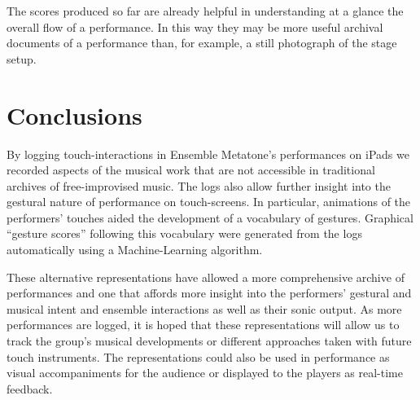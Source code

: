 \documentclass[graybox]{svmult}
\begin{document}
The scores produced so far are already helpful in understanding at a
glance the overall flow of a performance. In this way they may be more
useful archival documents of a performance than, for example, a still
photograph of the stage setup.

\section{Conclusions}

By logging touch-interactions in Ensemble Metatone's performances on
iPads we recorded aspects of the musical work that are not accessible
in traditional archives of free-improvised music. The logs also allow
further insight into the gestural nature of performance on
touch-screens. In particular, animations of the performers' touches
aided the development of a vocabulary of gestures.  Graphical
``gesture scores'' following this vocabulary were generated from
the logs automatically using a Machine-Learning algorithm. 

These alternative representations have allowed a more comprehensive archive
of performances and one that affords more insight into the performers'
gestural and musical intent and ensemble interactions as well as
their sonic output. As more performances are logged, it is hoped that
these representations will allow us to track the group's musical
developments or different approaches taken with future touch
instruments. The representations could also be used in performance as
visual accompaniments for the audience or displayed to the players as
real-time feedback.



\end{document}
